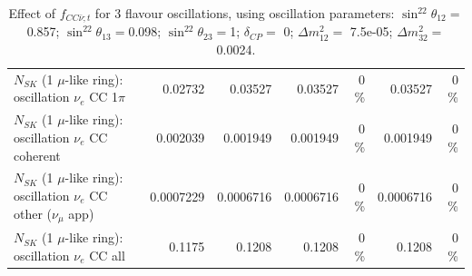 \begin{table}
\begin{tabular}{| l | r | r | r  r | r  r |}
                     $N_{SK}$ (1 $\mu$-like ring): oscillation $\nu_e$ CC 1$\pi$ &         0.02732 &         0.03527 &         0.03527 &        0 \%  &         0.03527 &        0 \%  \\ 
                   $N_{SK}$ (1 $\mu$-like ring): oscillation $\nu_e$ CC coherent &        0.002039 &        0.001949 &        0.001949 &        0 \%  &        0.001949 &        0 \%  \\ 
      $N_{SK}$ (1 $\mu$-like ring): oscillation $\nu_e$ CC other ($\nu_\mu$ app) &       0.0007229 &       0.0006716 &       0.0006716 &        0 \%  &       0.0006716 &        0 \%  \\ 
                       $N_{SK}$ (1 $\mu$-like ring): oscillation $\nu_e$  CC all &          0.1175 &          0.1208 &          0.1208 &        0 \%  &          0.1208 &        0 \%  \\ 
\hline
\hline
\end{tabular}
\caption{ Effect of $f_{CC\bar{\nu}; t}$ for 3 flavour oscillations, using oscillation parameters:  $\sin^22\theta_{12} = $0.857; $\sin^22\theta_{13} = $0.098; $\sin^22\theta_{23} = $1; $\delta_{CP} = $        0; $\Delta m^2_{12} = $    7.5e-05; $\Delta m^2_{32} = $    0.0024. }
\label{tab:num_xsec_norm_antinutonu_1RmuT_3f_osc_t13:0.098}
\end{table}
\clearpage
